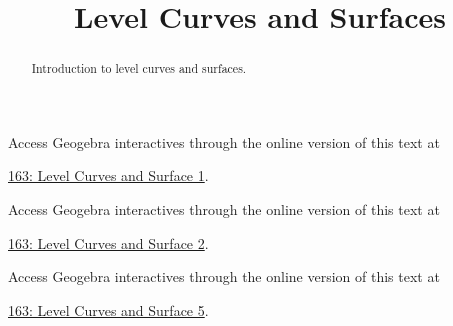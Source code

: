 \documentclass{ximera}
\title{Level Curves and Surfaces}
\begin{document}
\begin{abstract}
Introduction to level curves and surfaces.
\end{abstract}
\maketitle



\begin{example}  \label{Edfhpgdf45}

 
\begin{onlineOnly}
    \begin{center}
\end{center}
\end{onlineOnly}

Access Geogebra interactives through the online version of this text at
 
\href{https://www.geogebra.org/classic/nk4ap6kj}{163: Level Curves and Surface 1}.
\end{example}



\begin{example}  \label{Edfhpgdf45}

 
\begin{onlineOnly}
    \begin{center}
\end{center}
\end{onlineOnly}

Access Geogebra interactives through the online version of this text at
 
\href{https://www.geogebra.org/classic/vk7zt92m}{163: Level Curves and Surface 2}.
\end{example}


\begin{example}  \label{Ed5465f45}

 
\begin{onlineOnly}
    \begin{center}
\end{center}
\end{onlineOnly}

Access Geogebra interactives through the online version of this text at
 
\href{https://www.geogebra.org/classic/xgj5cv9x}{163: Level Curves and Surface 5}.
\end{example}
\end{document}
